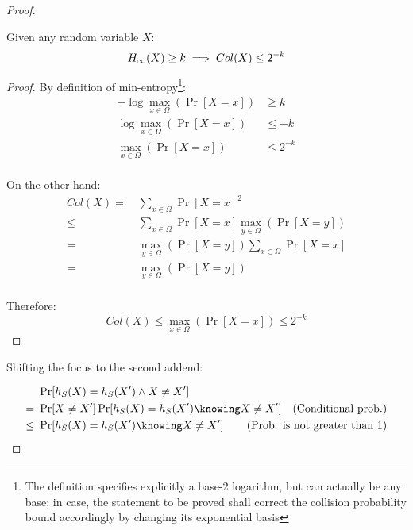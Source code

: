\begin{proof}
    \begin{proposition}
        Given any random variable $X$:
        \[
            H_\infty(X) \geq k \implies Col(X) \leq 2^{-k} \qedhere
        \]
    \end{proposition}

    \begin{proof}
        By definition of min-entropy\footnote{The definition specifies explicitly a base-2 logarithm, but can actually be any base; in case, the statement to be proved shall correct the collision probability bound accordingly by changing its exponential basis}:
        \begin{align*}
            -\log \max_{x \in \Omega}(\Pr [X = x]) &\geq k      \\
            \log \max_{x \in \Omega}(\Pr [X = x])  &\leq -k     \\
            \max_{x \in \Omega}(\Pr [X = x])       &\leq 2^{-k} \\
        \end{align*}

        On the other hand:
        \begin{align*}
            Col(X) =&\ \sum_{x \in \Omega} \Pr[X = x]^2                               \\
                \leq&\ \sum_{x \in \Omega} \Pr[X = x] \max_{y \in \Omega}(\Pr[X = y]) \\
                   =&\ \max_{y \in \Omega}(\Pr[X = y]) \sum_{x \in \Omega} \Pr[X = x] \\
                   =&\ \max_{y \in \Omega}(\Pr[X = y])                                \\
        \end{align*}

        Therefore:
        \[
            Col(X) \leq \max_{x \in \Omega}(\Pr[X = x]) \leq 2^{-k}
        \]
    \end{proof}

    Shifting the focus to the second addend:

    \begin{align*}
            &\ \Pr[h_S(X) = h_S(X') \wedge X \neq X']                  &                                                  \\
           =&\ \Pr[X \neq X'] \Pr[h_S(X) = h_S(X') \knowing X \neq X'] & \text{(Conditional prob.)}                       \\
        \leq&\ \Pr[h_S(X) = h_S(X') \knowing X \neq X']                & \mathllap{\text{(Prob. is not greater than 1)}}  \\
    \end{align*}


\end{proof}
